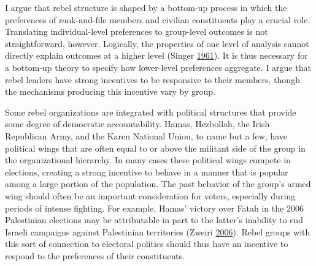 \documentclass[12pt,]{book}
\theoremstyle{definition}
\theoremstyle{definition}
\theoremstyle{definition}
\theoremstyle{remark}
\begin{document}
I argue that rebel structure is shaped by a bottom-up process in which
the preferences of rank-and-file members and civilian constituents play
a crucial role. Translating individual-level preferences to group-level
outcomes is not straightforward, however. Logically, the properties of
one level of analysis cannot directly explain outcomes at a higher level
(Singer \protect\hyperlink{ref-Singer1961}{1961}). It is thus necessary
for a bottom-up theory to specify how lower-level preferences aggregate.
I argue that rebel leaders have strong incentives to be responsive to
their members, though the mechanisms producing this incentive vary by
group.

Some rebel organizations are integrated with political structures that
provide some degree of democratic accountability. Hamas, Hezbollah, the
Irish Republican Army, and the Karen National Union, to name but a few,
have political wings that are often equal to or above the militant side
of the group in the organizational hierarchy. In many cases these
political wings compete in elections, creating a strong incentive to
behave in a manner that is popular among a large portion of the
population. The past behavior of the group's armed wing should often be
an important consideration for voters, especially during periods of
intense fighting. For example, Hamas' victory over Fatah in the 2006
Palestinian elections may be attributable in part to the latter's
inability to end Israeli campaigns against Palestinian territories
(Zweiri \protect\hyperlink{ref-Zweiri2006}{2006}). Rebel groups with
this sort of connection to electoral politics should thus have an
incentive to respond to the preferences of their constituents.
\end{document}
